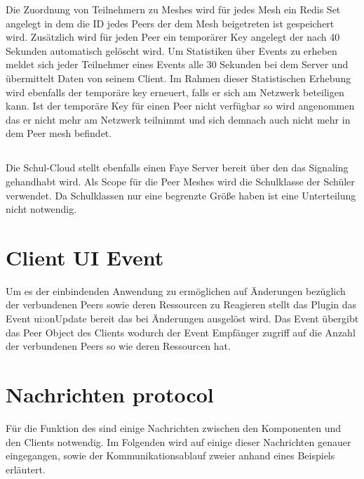 \begin{description}
Die Zuordnung von Teilnehmern zu Meshes wird für jedes Mesh ein Redis Set angelegt in dem die ID jedes Peers der dem Mesh beigetreten ist gespeichert wird. Zusätzlich wird für jeden Peer ein temporärer Key angelegt der nach 40 Sekunden automatisch gelöscht wird. Um Statistiken über Events zu erheben meldet sich jeder Teilnehmer eines Events alle 30 Sekunden bei dem Server und übermittelt Daten von seinem Client. Im Rahmen dieser Statistischen Erhebung wird ebenfalls der temporäre key erneuert, falls er sich am \pTp Netzwerk beteiligen kann. Ist der temporäre Key für einen Peer nicht verfügbar so wird angenommen das er nicht mehr am \pTp Netzwerk teilnimmt und sich demnach auch nicht mehr in dem Peer mesh befindet.     

\subsection{\schulCloud}

Die Schul-Cloud stellt ebenfalls einen Faye Server bereit über den das Signaling gehandhabt wird. Als Scope für die Peer Meshes wird die Schulklasse der Schüler verwendet. Da Schulklassen nur eine begrenzte Größe haben ist eine Unterteilung nicht notwendig.


\section{Client UI Event}
Um es der einbindenden Anwendung zu ermöglichen auf Änderungen bezüglich der verbundenen Peers sowie deren Ressourcen zu Reagieren stellt das Plugin das Event ui:onUpdate bereit das bei Änderungen ausgelöst wird. Das Event übergibt das Peer Object des Clients wodurch der Event Empfänger zugriff auf die Anzahl der verbundenen Peers so wie deren Ressourcen hat. 

\section{Nachrichten protocol}

Für die Funktion des \cdns sind einige Nachrichten zwischen den Komponenten und den Clients notwendig. Im Folgenden wird auf einige dieser Nachrichten genauer eingegangen, sowie der Kommunikationsablauf zweier \clients anhand eines Beispiels erläutert.


\end{description}
